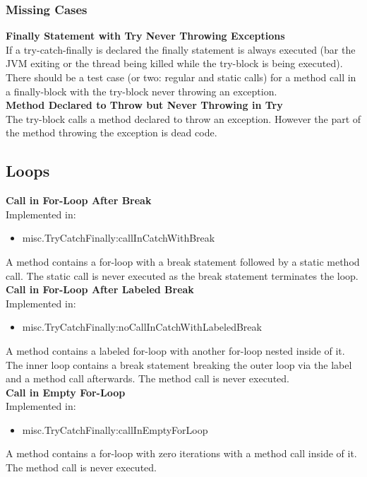 \documentclass{article}
\begin{document}
\subsubsection{Missing Cases}

\textbf{Finally Statement with Try Never Throwing Exceptions}\\
If a try-catch-finally is declared the finally statement is always executed (bar the JVM exiting or the thread being killed while the try-block is being executed). There should be a test case (or two: regular and static calls) for a method call in a finally-block with the try-block never throwing an exception.\\

\noindent
\textbf{Method Declared to Throw but Never Throwing in Try}\\
The try-block calls a method declared to throw an exception. However the part of the method throwing the exception is dead code.\\

\subsection{Loops}

\textbf{Call in For-Loop After Break}\\
Implemented in: 
\begin{itemize}
    \item misc.TryCatchFinally:callInCatchWithBreak
\end{itemize}
A method contains a for-loop with a break statement followed by a static method call. The static call is never executed as the break statement terminates the loop.\\

\noindent
\textbf{Call in For-Loop After Labeled Break}\\
Implemented in: 
\begin{itemize}
    \item misc.TryCatchFinally:noCallInCatchWithLabeledBreak
\end{itemize}
A method contains a labeled for-loop with another for-loop nested inside of it. The inner loop contains a break statement breaking the outer loop via the label and a method call afterwards. The method call is never executed.\\

\noindent
\textbf{Call in Empty For-Loop}\\
Implemented in: 
\begin{itemize}
    \item misc.TryCatchFinally:callInEmptyForLoop
\end{itemize}
A method contains a for-loop with zero iterations with a method call inside of it. The method call is never executed.\\
\end{document}
